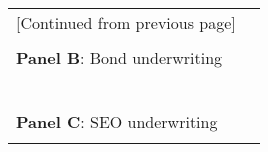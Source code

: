 		\begin{table}[H] \begin{center} 
		\begin{threeparttable} 
		\begin{tabular*}{\hsize}{@{\hskip\tabcolsep\extracolsep\fill}l*{6}{c}}
			 \multicolumn{6}{c}{[Continued from previous page]} \\ \\
			 \multicolumn{6}{l}{\textbf{Panel B}: Bond underwriting} \\
			\toprule  
				\def\sym#1{\ifmmode^{#1}\else\(^{#1}\)\fi}
				 
			\bottomrule \\ ~ \\
			\multicolumn{6}{l}{\textbf{Panel C}: SEO underwriting} \\
			\toprule  
				\def\sym#1{\ifmmode^{#1}\else\(^{#1}\)\fi}
				 
			\bottomrule \\
			\end{tabular*}
	\end{threeparttable} \end{center}
\end{table}
\clearpage \newpage

